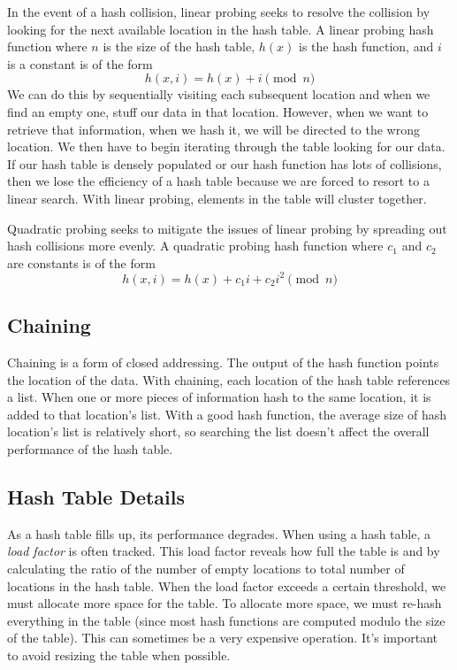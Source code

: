 In the event of a hash collision, linear probing seeks to resolve the collision by looking for the next available location in the hash table.
A linear probing hash function where $n$ is the size of the hash table, $h(x)$ is the hash function, and $i$ is a constant is of the form
\begin{equation*}
h(x, i) = h(x) + i \pmod{n}
\end{equation*}
We can do this by sequentially visiting each subsequent location and when we find an empty one, stuff our data in that location.  
However, when we want to retrieve that information, when we hash it, we will be directed to the wrong location. 
We then have to begin iterating through the table looking for our data.
If our hash table is densely populated or our hash function has lots of collisions, 
then we lose the efficiency of a hash table because we are forced to resort to a linear search.
With linear probing, elements in the table will cluster together.

Quadratic probing seeks to mitigate the issues of linear probing by spreading out hash collisions more evenly.   
A quadratic probing hash function where $c_1$ and $c_2$ are constants is of the form
\begin{equation*}
h(x, i) = h(x) + c_1i + c_2i^2 \pmod{n}
\end{equation*}

\subsection*{Chaining}
Chaining is a form of closed addressing.  The output of the hash function points the location of the data. 
With chaining, each location of the hash table references a list.
When one or more pieces of information hash to the same location, it is added to that location's list.  
With a good hash function, the average size of hash location's list is relatively short,
so searching the list doesn't affect the overall performance of the hash table.

\subsection*{Hash Table Details}
As a hash table fills up, its performance degrades.
When using a hash table, a \emph{load factor} is often tracked.
This load factor reveals how full the table is and by calculating the ratio of the number of empty locations to total number of locations in the hash table.
When the load factor exceeds a certain threshold, we must allocate more space for the table.
To allocate more space, we must re-hash everything in the table (since most hash functions are computed modulo the size of the table).
This can sometimes be a very expensive operation.
It's important to avoid resizing the table when possible.

